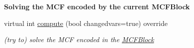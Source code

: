 \begin{Indent}\textbf{ Solving the M\+CF encoded by the current M\+C\+F\+Block}\par
\begin{DoxyCompactItemize}
\item 
\mbox{\label{class_s_m_spp__di__unipi__it_1_1_m_c_f_solver_afc8ff54ab05d22f4cca0fb0bfbeb7a49}} 
virtual int \mbox{\hyperlink{class_s_m_spp__di__unipi__it_1_1_m_c_f_solver_afc8ff54ab05d22f4cca0fb0bfbeb7a49}{compute}} (bool changedvars=true) override
\begin{DoxyCompactList}\small\item\em (try to) solve the M\+CF encoded in the \mbox{\hyperlink{class_s_m_spp__di__unipi__it_1_1_m_c_f_block}{M\+C\+F\+Block}} \end{DoxyCompactList}\end{DoxyCompactItemize}
\end{Indent}
